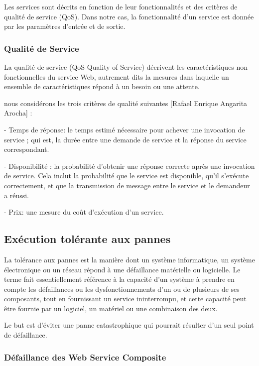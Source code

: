 Les services sont décrits en fonction de leur fonctionnalités et des critères de qualité de service (QoS). Dans notre cas, la fonctionnalité d’un service est donnée par les paramètres d’entrée et de sortie.

\subsubsection { Qualité de Service }

La qualité de service (QoS Quality of Service) décrivent les caractéristiques non fonctionnelles du service Web, autrement dits la mesures dans laquelle un ensemble de caractéristiques répond à un besoin ou une attente.

nous considérons les trois critères de qualité suivantes [Rafael Enrique Angarita Arocha] :

- Temps de réponse: le temps estimé nécessaire pour achever une invocation de service ; qui est, la durée entre une demande de service et la réponse du service correspondant.

- Disponibilité : la probabilité d’obtenir une réponse correcte après une invocation de service. Cela inclut la probabilité que le service est disponible, qu’il s’exécute correctement, et que la transmission de message entre le
service et le demandeur a réussi.
 
- Prix: une mesure du coût d’exécution d’un service.


\subsection{Exécution tolérante aux pannes}

La tolérance aux pannes est la manière dont un système informatique, un système électronique ou un réseau répond à une défaillance matérielle ou logicielle. Le terme fait essentiellement référence à la capacité d'un système à prendre en compte les défaillances ou les dysfonctionnements d’un ou de plusieurs de ses composants, tout en fournissant un service ininterrompu, et cette capacité peut être fournie par un logiciel, un matériel ou une combinaison des deux.

Le but est d'éviter une panne catastrophique qui pourrait résulter d'un seul point de défaillance. 

\subsubsection{Défaillance des Web Service Composite}

